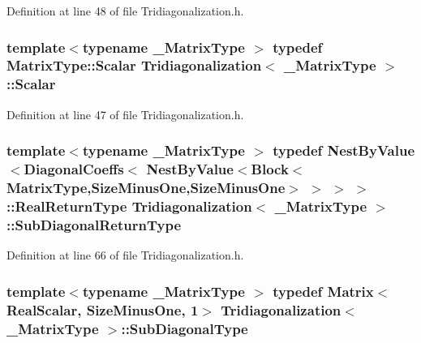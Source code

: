 Definition at line 48 of file Tridiagonalization.\-h.

\hypertarget{class_tridiagonalization_af2675cb1bbb7f8887cfd61322141a699}{
\subsubsection[{Scalar}]{\setlength{\rightskip}{0pt plus 5cm}template$<$typename \-\_\-\-Matrix\-Type $>$ typedef Matrix\-Type\-::\-Scalar {\bf Tridiagonalization}$<$ \-\_\-\-Matrix\-Type $>$\-::{\bf Scalar}}}\label{class_tridiagonalization_af2675cb1bbb7f8887cfd61322141a699}


Definition at line 47 of file Tridiagonalization.\-h.

\hypertarget{class_tridiagonalization_a33e6be2d3c2de1a7cebc05f5b90dc50a}{
\subsubsection[{Sub\-Diagonal\-Return\-Type}]{\setlength{\rightskip}{0pt plus 5cm}template$<$typename \-\_\-\-Matrix\-Type $>$ typedef {\bf Nest\-By\-Value}$<${\bf Diagonal\-Coeffs}$<$ {\bf Nest\-By\-Value}$<${\bf Block}$<${\bf Matrix\-Type},{\bf Size\-Minus\-One},{\bf Size\-Minus\-One}$>$ $>$ $>$ $>$\-::Real\-Return\-Type {\bf Tridiagonalization}$<$ \-\_\-\-Matrix\-Type $>$\-::{\bf Sub\-Diagonal\-Return\-Type}}}\label{class_tridiagonalization_a33e6be2d3c2de1a7cebc05f5b90dc50a}


Definition at line 66 of file Tridiagonalization.\-h.

\hypertarget{class_tridiagonalization_aa2c70f74fdd0ebda80b4dec2248f3732}{
\subsubsection[{Sub\-Diagonal\-Type}]{\setlength{\rightskip}{0pt plus 5cm}template$<$typename \-\_\-\-Matrix\-Type $>$ typedef {\bf Matrix}$<${\bf Real\-Scalar}, {\bf Size\-Minus\-One}, 1$>$ {\bf Tridiagonalization}$<$ \-\_\-\-Matrix\-Type $>$\-::{\bf Sub\-Diagonal\-Type}}}\label{class_tridiagonalization_aa2c70f74fdd0ebda80b4dec2248f3732}


